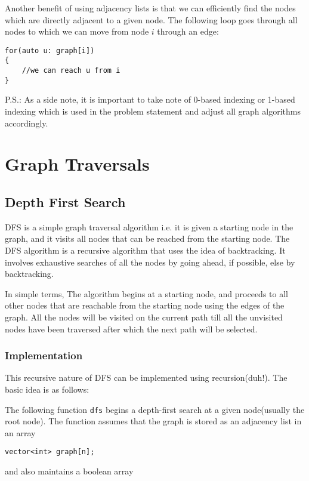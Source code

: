 \documentclass[twoside,12pt,a4paper,english]{book}
\theoremstyle{definition}
\theoremstyle{problemstyle}
\theoremstyle{problemstyle}
\theoremstyle{problemstyle}
\begin{document}
Another benefit of using adjacency lists is that we can efficiently find the nodes which are directly adjacent to a given node. The following loop goes through all nodes to which we can move from node $i$ through an edge:

\begin{lstlisting}
for(auto u: graph[i])
{
    //we can reach u from i
}
\end{lstlisting}

P.S.: As a side note, it is important to take note of 0-based indexing or 1-based indexing which is used in the problem statement and adjust all graph algorithms accordingly.

\part{Graph Traversals}

\chapter{Depth First Search}
DFS is a simple graph traversal algorithm i.e. it is given a starting node in the graph, and it visits all nodes that can be reached from the starting node. The DFS algorithm is a recursive algorithm that uses the idea of backtracking. It involves exhaustive searches of all the nodes by going ahead, if possible, else by backtracking.

In simple terms, The algorithm begins at a starting node, and proceeds to all other nodes that are reachable from the starting node using the edges of the graph. All the nodes will be visited on the current path till all the unvisited nodes have been traversed after which the next path will be selected.

\section{Implementation}

This recursive nature of DFS can be implemented using recursion(duh!). The basic idea is as follows:

The following function \texttt{dfs} begins a depth-first search at a given node(usually the root node). The function assumes that the graph is stored as an adjacency list in an array

\begin{lstlisting}
vector<int> graph[n];
\end{lstlisting}

and also maintains a boolean array
\end{document}
